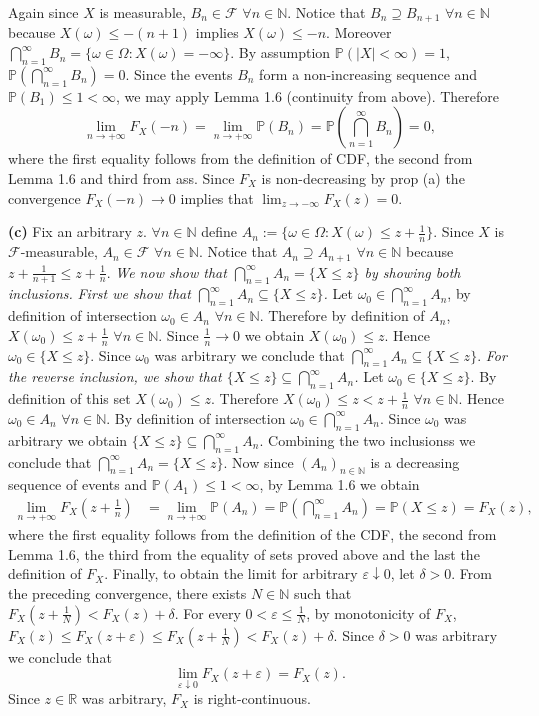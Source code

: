 \documentclass[11pt,a4paper]{article}
\newcommand{\studylabel}[1]{\textcolor{StudyBlue}{\textnormal{\bfseries #1}}}
\begin{document}
Again since $X$ is measurable, $B_n\in\mathcal F$ $\forall n\in\mathbb N$.
Notice that $B_n\supseteq B_{n+1}$ $\forall n\in\mathbb N$ because $X(\omega)\le-(n+1)$ implies $X(\omega)\le-n$.
Moreover $\bigcap_{n=1}^\infty B_n=\{\omega\in\Omega:X(\omega)=-\infty\}$.
By assumption $\mathbb P(|X|<\infty)=1$, $\mathbb P(\bigcap_{n=1}^\infty B_n)=0$.
Since the events $B_n$ form a non-increasing sequence and $\mathbb P(B_1)\le1<\infty$, we may apply Lemma 1.6 (continuity from above).
Therefore
\[
\lim_{n\to+\infty}F_X(-n)=\lim_{n\to+\infty}\mathbb P(B_n)
=\mathbb P\left(\bigcap_{n=1}^\infty B_n\right)=0,
\]
where the first equality follows from the definition of CDF, the second from Lemma 1.6 and third from ass.
Since $F_X$ is non-decreasing by prop (a) the convergence $F_X(-n)\to0$ implies that $\lim_{z\to-\infty}F_X(z)=0$.

\studylabel{(c)}
Fix an arbitrary $z$. $\forall n\in\mathbb N$ define $A_n:=\{\omega\in\Omega:X(\omega)\le z+\frac1n\}$.
Since $X$ is $\mathcal F$-measurable, $A_n\in\mathcal F$ $\forall n\in\mathbb N$.
Notice that $A_n\supseteq A_{n+1}$ $\forall n\in\mathbb N$ because $z+\frac1{n+1}\le z+\frac1n$.
\emph{We now show that $\bigcap_{n=1}^\infty A_n=\{X\le z\}$ by showing both inclusions.}
\emph{First we show that $\bigcap_{n=1}^\infty A_n\subseteq\{X\le z\}$.} Let $\omega_0\in\bigcap_{n=1}^\infty A_n$, by definition of intersection $\omega_0\in A_n$ $\forall n\in\mathbb N$.
Therefore by definition of $A_n$, $X(\omega_0)\le z+\frac1n$ $\forall n\in\mathbb N$.
Since $\frac1n\to0$ we obtain $X(\omega_0)\le z$.
Hence $\omega_0\in\{X\le z\}$.
Since $\omega_0$ was arbitrary we conclude that $\bigcap_{n=1}^\infty A_n\subseteq\{X\le z\}$.
\emph{For the reverse inclusion, we show that $\{X\le z\}\subseteq\bigcap_{n=1}^\infty A_n$.} Let $\omega_0\in\{X\le z\}$.
By definition of this set $X(\omega_0)\le z$.
Therefore $X(\omega_0)\le z<z+\frac1n$ $\forall n\in\mathbb N$.
Hence $\omega_0\in A_n$ $\forall n\in\mathbb N$.
By definition of intersection $\omega_0\in\bigcap_{n=1}^\infty A_n$.
Since $\omega_0$ was arbitrary we obtain $\{X\le z\}\subseteq\bigcap_{n=1}^\infty A_n$.
Combining the two inclusionss we conclude that $\bigcap_{n=1}^\infty A_n=\{X\le z\}$.
Now since $(A_n)_{n\in\mathbb N}$ is a decreasing sequence of events and $\mathbb P(A_1)\le1<\infty$, by Lemma 1.6 we obtain
\[
\begin{aligned}
\lim_{n\to+\infty}F_X(z+\tfrac1n)
&=\lim_{n\to+\infty}\mathbb P(A_n)=\mathbb P\left(\bigcap_{n=1}^\infty A_n\right) =\mathbb P(X\le z)=F_X(z),
\end{aligned}
\]
where the first equality follows from the definition of the CDF, the second from Lemma 1.6, the third from the equality of sets proved above and the last the definition of $F_X$.
Finally, to obtain the limit for arbitrary $\varepsilon\downarrow0$, let $\delta>0$.
From the preceding convergence, there exists $N\in\mathbb N$ such that $F_X(z+\frac1N)<F_X(z)+\delta$.
For every $0<\varepsilon\le\frac1N$, by monotonicity of $F_X$,
$F_X(z)\le F_X(z+\varepsilon)\le F_X(z+\frac1N)<F_X(z)+\delta$.
Since $\delta>0$ was arbitrary we conclude that
\[
\lim_{\varepsilon\downarrow0}F_X(z+\varepsilon)=F_X(z).
\]
Since $z\in\mathbb R$ was arbitrary, $F_X$ is right-continuous.
%
\end{document}
